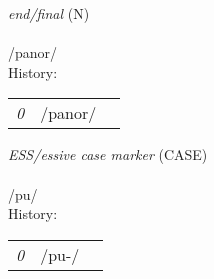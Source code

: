 \vspace{15pt}
\begin{nopagebreak}
 \textit{end/final} (N)\\
\\
\noindent /p{\textprimstress}anor/\\


\noindent History:

\vspace{-0pt}
\hspace{40pt}
\begin{tabular}{ccc}
\textit{0} & /panor/& \\
\end{tabular}

\vspace{20pt}\hline

\end{nopagebreak}
\filbreak



\vspace{15pt}
\begin{nopagebreak}
 \textit{ESS/essive case marker} (CASE)\\
\\
\noindent /p{\textprimstress}u/\\


\noindent History:

\vspace{-0pt}
\hspace{40pt}
\begin{tabular}{ccc}
\textit{0} & /pu-/& \\
\end{tabular}

\vspace{20pt}\hline

\end{nopagebreak}
\filbreak



